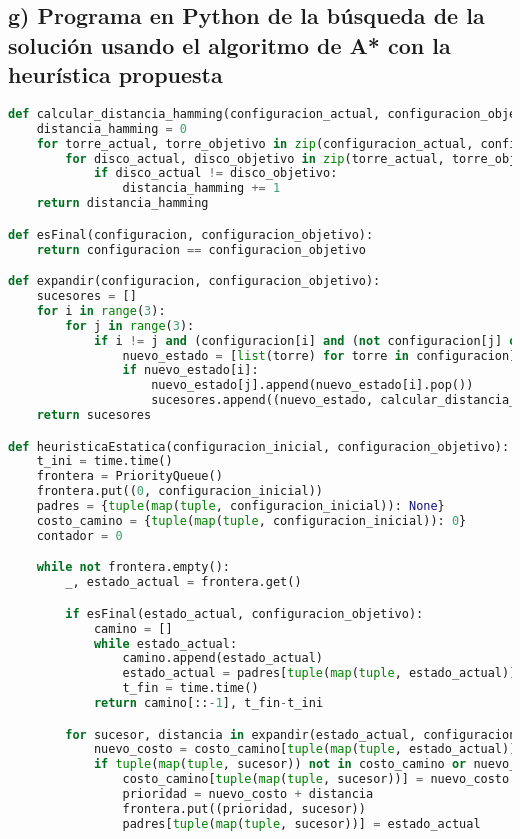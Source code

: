\documentclass{article}
\begin{document}
\subsection*{g) Programa en Python de la búsqueda de la solución usando el algoritmo de A* con la heurística propuesta}

\begin{lstlisting}[language=Python]
def calcular_distancia_hamming(configuracion_actual, configuracion_objetivo):
    distancia_hamming = 0
    for torre_actual, torre_objetivo in zip(configuracion_actual, configuracion_objetivo):
        for disco_actual, disco_objetivo in zip(torre_actual, torre_objetivo):
            if disco_actual != disco_objetivo:
                distancia_hamming += 1
    return distancia_hamming

def esFinal(configuracion, configuracion_objetivo):
    return configuracion == configuracion_objetivo

def expandir(configuracion, configuracion_objetivo):
    sucesores = []
    for i in range(3):
        for j in range(3):
            if i != j and (configuracion[i] and (not configuracion[j] or configuracion[i][-1] < configuracion[j][-1])):
                nuevo_estado = [list(torre) for torre in configuracion]
                if nuevo_estado[i]:
                    nuevo_estado[j].append(nuevo_estado[i].pop())
                    sucesores.append((nuevo_estado, calcular_distancia_hamming(nuevo_estado, configuracion_objetivo)))
    return sucesores

def heuristicaEstatica(configuracion_inicial, configuracion_objetivo):
    t_ini = time.time()
    frontera = PriorityQueue()
    frontera.put((0, configuracion_inicial))
    padres = {tuple(map(tuple, configuracion_inicial)): None}
    costo_camino = {tuple(map(tuple, configuracion_inicial)): 0}
    contador = 0

    while not frontera.empty():
        _, estado_actual = frontera.get()

        if esFinal(estado_actual, configuracion_objetivo):
            camino = []
            while estado_actual:
                camino.append(estado_actual)
                estado_actual = padres[tuple(map(tuple, estado_actual))]
                t_fin = time.time()
            return camino[::-1], t_fin-t_ini

        for sucesor, distancia in expandir(estado_actual, configuracion_objetivo):
            nuevo_costo = costo_camino[tuple(map(tuple, estado_actual))] + 1
            if tuple(map(tuple, sucesor)) not in costo_camino or nuevo_costo < costo_camino[tuple(map(tuple, sucesor))]:
                costo_camino[tuple(map(tuple, sucesor))] = nuevo_costo
                prioridad = nuevo_costo + distancia
                frontera.put((prioridad, sucesor))
                padres[tuple(map(tuple, sucesor))] = estado_actual
\end{lstlisting}
\end{document}
